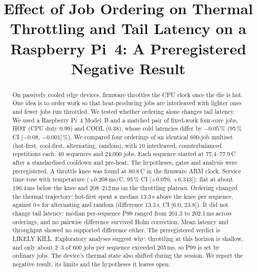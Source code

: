 \documentclass[conference,a4paper]{IEEEtran}
\newcommand{\degC}{\,\textdegree{}C}
\begin{document}
\title{Effect of Job Ordering on Thermal Throttling and Tail Latency on a Raspberry Pi~4: A Preregistered Negative Result}

\ifdefined\REVIEW
\author{
}
\else
\author{
\and
{}
}
\fi

\maketitle

\begin{abstract}
On passively cooled edge devices, firmware throttles the CPU clock once the die is hot. One idea is to order
work so that heat-producing jobs are interleaved with lighter ones and fewer jobs run throttled. We tested whether
ordering alone changes tail latency. We used a Raspberry Pi~4 Model~B and a matched pair of fixed-work four-core
jobs, HOT (CPU duty 0.99) and COOL (0.38), whose cold latencies differ by $-0.05$\,\% (95\,\% CI
[$-0.08$, $-0.001$]\,\%). We compared four orderings of an identical 600-job multiset (hot-first, cool-first,
alternating, random), with 10 interleaved, counterbalanced repetitions each: 40 sequences and 24{,}000 jobs. Each
sequence started at 77.4--77.9\degC{} after a standardised cooldown and pre-heat. The hypotheses, gates and
analysis were preregistered. A throttle knee was found at 80.8\degC{} in the firmware ARM clock. Service time
rose with temperature (+0.208\,ms/\textdegree{}C, 95\,\% CI [+0.070, +0.343]): flat at about 196.4\,ms below the
knee and 208--212\,ms on the throttling plateau. Ordering changed the thermal trajectory: hot-first spent a median
13.3\,s above the knee per sequence, against 0\,s for alternating and random (difference 13.3\,s, CI [6.0, 23.8]).
It did not change tail latency: median per-sequence P99 ranged from 201.3 to 202.1\,ms across orderings, and no
pairwise difference survived Holm correction. Mean latency and throughput showed no supported difference either.
The preregistered verdict is LIKELY KILL. Exploratory analyses suggest why: throttling at this horizon is shallow,
and only about 2--3 of 600 jobs per sequence exceeded 205\,ms, so P99 is set by ordinary jobs. The device's
thermal state also shifted during the session. We report the negative result, its limits and the hypotheses it
leaves open.
\end{abstract}
\end{document}
